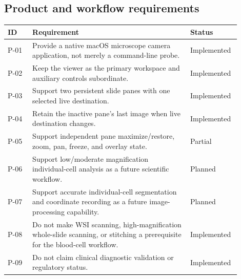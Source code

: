 \documentclass[11pt,a4paper,oneside]{article}
\newcommand{\implemented}{\textsf{Implemented}}
\newcommand{\partialstatus}{\textsf{Partial}}
\newcommand{\planned}{\textsf{Planned}}
\begin{document}
\subsection{Product and workflow requirements}
\begin{longtable}{p{0.10\linewidth}p{0.64\linewidth}p{0.16\linewidth}}
\toprule
ID & Requirement & Status\\
\midrule
P-01 & Provide a native macOS microscope camera application, not merely a command-line probe. & \implemented\\
P-02 & Keep the viewer as the primary workspace and auxiliary controls subordinate. & \implemented\\
P-03 & Support two persistent slide panes with one selected live destination. & \implemented\\
P-04 & Retain the inactive pane's last image when live destination changes. & \implemented\\
P-05 & Support independent pane maximize/restore, zoom, pan, freeze, and overlay state. & \partialstatus\\
P-06 & Support low/moderate magnification individual-cell analysis as a future scientific workflow. & \planned\\
P-07 & Support accurate individual-cell segmentation and coordinate recording as a future image-processing capability. & \planned\\
P-08 & Do not make WSI scanning, high-magnification whole-slide scanning, or stitching a prerequisite for the blood-cell workflow. & \implemented\\
P-09 & Do not claim clinical diagnostic validation or regulatory status. & \implemented\\
\bottomrule
\end{longtable}
\end{document}
